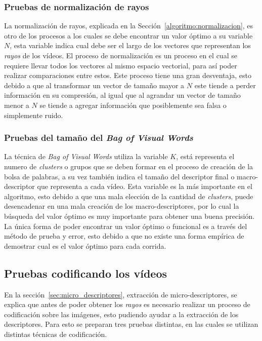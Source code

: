 \subsubsection{Pruebas de normalización de rayos}	

La normalización de rayos, explicada en la Sección~\ref{algoritmo:normalizacion}, es otro de los procesos a los cuales se debe encontrar un valor óptimo a su variable $N$, esta variable indica cual debe ser el largo de los vectores que representan los \textit{rayos} de los vídeos. El proceso de normalización es un proceso en el cual se requiere llevar todos los vectores al mismo espacio vectorial, para así poder realizar comparaciones entre estos. Este proceso tiene una gran desventaja, esto debido a que al transformar un vector de tamaño mayor a $N$ este tiende a perder información en su compresión, al igual que al agrandar un vector de tamaño menor a $N$ se tiende a agregar información que posiblemente sea falsa o simplemente ruido.

\subsubsection{Pruebas del tamaño del \textit{Bag of Visual Words}}
La técnica de \textit{Bag of Visual Words} utiliza la variable $K$, está representa el numero de \textit{clusters} o grupos que se deben formar en el proceso de creación de la bolsa de palabras, a su vez también indica el tamaño del descriptor final o macro-descriptor que representa a cada vídeo. Esta variable es la  más importante en el algoritmo, esto debido a que una mala elección de la cantidad de \textit{clusters}, puede desencadenar en una mala creación de los macro-descriptores, por lo cual la búsqueda del valor óptimo es muy importante para obtener una buena precisión. La única forma de poder encontrar un valor óptimo o funcional es a través del método de prueba y error, esto debido a que no existe una forma empírica de demostrar cual es el valor óptimo para cada corrida.



\subsection{Pruebas codificando los vídeos}
\label{exp:cod}
En la sección~\ref{sec:micro_descriptores}, extracción de micro-descriptores, se explica que antes de poder obtener los \textit{rayos} es necesario realizar un proceso de codificación sobre las imágenes, esto pudiendo ayudar a la extracción de los descriptores. Para esto se preparan tres pruebas distintas, en las cuales se utilizan distintas técnicas de codificación.

